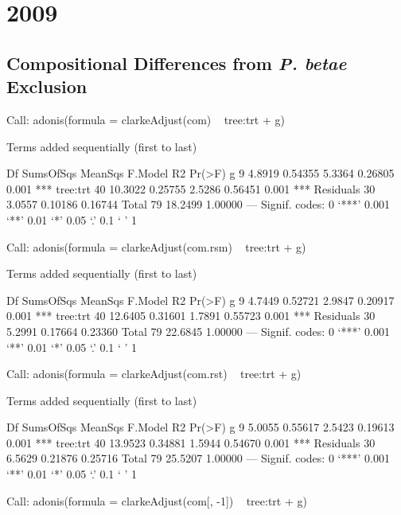 \documentclass[12pt]{article}
\begin{document}
\section{2009}


\subsection{Compositional Differences from \textit{P. betae} Exclusion}

\begin{Schunk}
\begin{Soutput}
Call:
adonis(formula = clarkeAdjust(com) ~ tree:trt + g) 

Terms added sequentially (first to last)

          Df SumsOfSqs MeanSqs F.Model      R2 Pr(>F)    
g          9    4.8919 0.54355  5.3364 0.26805  0.001 ***
tree:trt  40   10.3022 0.25755  2.5286 0.56451  0.001 ***
Residuals 30    3.0557 0.10186         0.16744           
Total     79   18.2499                 1.00000           
---
Signif. codes:  0 ‘***’ 0.001 ‘**’ 0.01 ‘*’ 0.05 ‘.’ 0.1 ‘ ’ 1 
\end{Soutput}
\begin{Soutput}
Call:
adonis(formula = clarkeAdjust(com.rsm) ~ tree:trt + g) 

Terms added sequentially (first to last)

          Df SumsOfSqs MeanSqs F.Model      R2 Pr(>F)    
g          9    4.7449 0.52721  2.9847 0.20917  0.001 ***
tree:trt  40   12.6405 0.31601  1.7891 0.55723  0.001 ***
Residuals 30    5.2991 0.17664         0.23360           
Total     79   22.6845                 1.00000           
---
Signif. codes:  0 ‘***’ 0.001 ‘**’ 0.01 ‘*’ 0.05 ‘.’ 0.1 ‘ ’ 1 
\end{Soutput}
\begin{Soutput}
Call:
adonis(formula = clarkeAdjust(com.rst) ~ tree:trt + g) 

Terms added sequentially (first to last)

          Df SumsOfSqs MeanSqs F.Model      R2 Pr(>F)    
g          9    5.0055 0.55617  2.5423 0.19613  0.001 ***
tree:trt  40   13.9523 0.34881  1.5944 0.54670  0.001 ***
Residuals 30    6.5629 0.21876         0.25716           
Total     79   25.5207                 1.00000           
---
Signif. codes:  0 ‘***’ 0.001 ‘**’ 0.01 ‘*’ 0.05 ‘.’ 0.1 ‘ ’ 1 
\end{Soutput}
\begin{Soutput}
Call:
adonis(formula = clarkeAdjust(com[, -1]) ~ tree:trt + g) 


\end{Soutput}
\end{Schunk}
\end{document}
